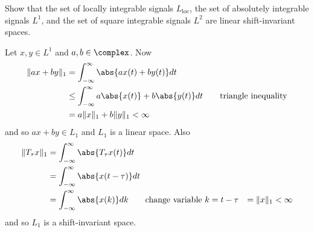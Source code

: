 \begin{excersizelist}
\begin{solution}
\end{solution}


\item \label{exer:L1L2linearshiftinvariant} Show that the set of locally integrable signals $L_{\text{loc}}$, the set of absolutely integrable signals $L^1$, and the set of square integrable signals $L^2$ are linear shift-invariant spaces. 
\begin{solution}
Let $x, y \in L^1$ and $a, b \in \complex$.  Now
\begin{align*}
\|a x + b y\|_1 &= \int_{-\infty}^\infty \abs{ax(t) + by(t)} dt \\
&\leq \int_{-\infty}^\infty a\abs{x(t)} + b\abs{y(t)} dt \qquad \text{triangle inequality} \\
&= a \|x\|_1 + b\|y\|_1 < \infty
\end{align*}
and so $ax + by \in L_1$ and $L_1$ is a linear space.  Also
\begin{align*}
\|T_\tau x\|_1 &= \int_{-\infty}^\infty \abs{ T_\tau x(t) } dt \\
&= \int_{-\infty}^\infty \abs{x(t - \tau)} dt \\
&= \int_{-\infty}^\infty \abs{x(k)} dk \qquad \text{change variable $k = t - \tau$}
&= \|x\|_1 < \infty
\end{align*}
and so $L_1$ is a shift-invariant space.


\end{solution}
\end{excersizelist}
